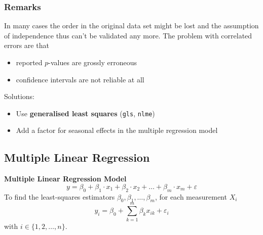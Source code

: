 \documentclass[11pt]{article}
\theoremstyle{definition}
\begin{document}
\subsubsection{Remarks}
In many cases the order in the original data set might be lost and the assumption of independence thus can't be validated any more. The problem with correlated errors are that
\begin{itemize}[label=-,nosep]
	\item reported $p$-values are grossly erroneous
	\item confidence intervals are not reliable at all
\end{itemize}

Solutions:
\begin{itemize}
	\item Use \textbf{generalised least squares} (\texttt{gls}, \texttt{nlme})
	\item Add a factor for seasonal effects in the multiple regression model
\end{itemize}

\subsection{Multiple Linear Regression}
\textbf{Multiple Linear Regression Model}
\begin{equation*}
	y = \beta_0 + \beta_1\cdot x_1 + \beta_2\cdot x_2 + \dots + \beta_m\cdot x_m + \varepsilon
\end{equation*}
To find the least-squares estimators $\beta_0,\beta_1,\dots,\beta_m$, for each measurement $X_i$
\begin{equation*}
	y_i = \beta_0 + \sum_{k=1}^{m}\beta_k x_{ik} + \varepsilon_i
\end{equation*}
with $i\in\{1,2,\dots,n\}$.
\end{document}
